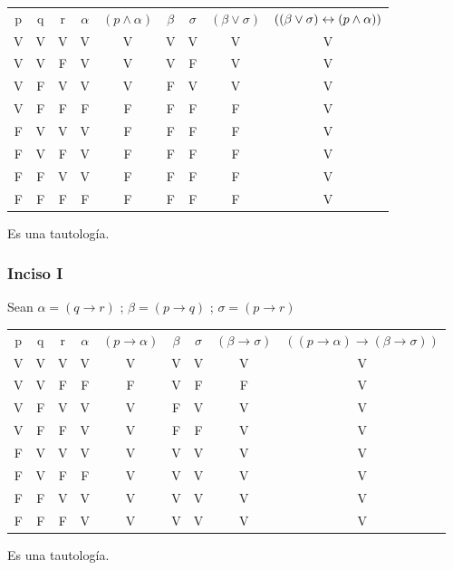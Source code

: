 \begin{tabular}{c|c|c|c|c|c|c|c|c}
    p & q & r & $\alpha$ & $(p \wedge \alpha)$ & $\beta$ & $\sigma$ & $(\beta \vee \sigma)$ & $((\beta \vee \sigma) \leftrightarrow (p \wedge \alpha))$\\
    V & V & V & V & V & V & V & V & V \\
    V & V & F & V & V & V & F & V & V \\
    V & F & V & V & V & F & V & V & V \\
    V & F & F & F & F & F & F & F & V \\
    F & V & V & V & F & F & F & F & V \\
    F & V & F & V & F & F & F & F & V \\
    F & F & V & V & F & F & F & F & V \\
    F & F & F & F & F & F & F & F & V
\end{tabular}

Es una tautología.

\subsubsection{Inciso I}

Sean $\alpha = (q\rightarrow r)$ ; $\beta = (p \rightarrow q)$ ; $\sigma = (p \rightarrow r)$

\begin{tabular}{c|c|c|c|c|c|c|c|c}
    p & q & r & $\alpha$ & $(p \rightarrow \alpha)$ & $\beta$ & $\sigma$ & $(\beta \rightarrow \sigma)$ & $((p \rightarrow \alpha) \rightarrow (\beta \rightarrow \sigma))$\\
    V & V & V & V & V & V & V & V & V \\
    V & V & F & F & F & V & F & F & V \\
    V & F & V & V & V & F & V & V & V \\
    V & F & F & V & V & F & F & V & V \\
    F & V & V & V & V & V & V & V & V \\
    F & V & F & F & V & V & V & V & V \\
    F & F & V & V & V & V & V & V & V \\
    F & F & F & V & V & V & V & V & V
\end{tabular}

Es una tautología.

